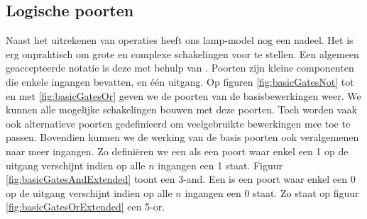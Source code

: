 \subsection{Logische poorten}
\label{ss:logischePoorten}
Naast het uitrekenen van operaties heeft ons lamp-model nog een nadeel. Het is erg onpraktisch om grote en complexe schakelingen voor te stellen. Een algemeen geaccepteerde notatie is deze met behulp van . Poorten zijn kleine componenten die enkele ingangen bevatten, en \'e\'en uitgang. Op figuren \ref{fig:basicGatesNot} tot en met \ref{fig:basicGatesOr} geven we de poorten van de basisbewerkingen weer. We kunnen alle mogelijke schakelingen bouwen met deze poorten. Toch worden vaak ook alternatieve poorten gedefinieerd om veelgebruikte bewerkingen mee toe te passen. Bovendien kunnen we de werking van de basis poorten ook veralgemenen naar meer ingangen. Zo defini\"eren we een  als een poort waar enkel een 1 op de uitgang verschijnt indien op alle $n$ ingangen een 1 staat. Figuur \ref{fig:basicGatesAndExtended} toont een 3-and. Een  is een poort waar enkel een 0 op de uitgang verschijnt indien op alle $n$ ingangen een 0 staat. Zo staat op figuur \ref{fig:basicGatesOrExtended} een 5-or.
